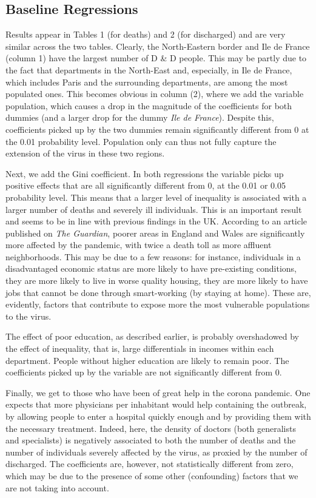 \documentclass[a4paper]{article}
\theoremstyle{plain}
\theoremstyle{definition}
\begin{document}
\subsection{Baseline Regressions}
Results appear in Tables 1 (for deaths) and 2 (for discharged) and are very similar across the two tables. Clearly, the North-Eastern border and Ile de France (column 1) have the largest number of D \& D people. This may be partly due to the fact that departments in the North-East and, especially, in Ile de France, which includes Paris and the surrounding departments, are among the most populated ones. This becomes obvious in column (2), where we add the variable population, which causes a drop in the magnitude of the coefficients for both dummies (and a larger drop for the dummy \textit{Ile de France}). Despite this, coefficients picked up by the two dummies remain significantly different from 0 at the 0.01 probability level. Population only can thus not fully capture the extension of the virus in these two regions.

Next, we add the Gini coefficient. In both regressions the variable picks up positive effects that are all significantly different from 0, at the 0.01 or 0.05 probability level. This means that a larger level of inequality is associated with a larger number of deaths and severely ill individuals. This is an important result and seems to be in line with previous findings in the UK. According to an article published on \textit{The Guardian}, poorer areas in England and Wales are significantly more affected by the pandemic, with twice a death toll as more affluent neighborhoods. This may be due to a few reasons: for instance, individuals in a disadvantaged economic status are more likely to have pre-existing conditions, they are more likely to live in worse quality housing, they are more likely to have jobs that cannot be done through smart-working (by staying at home). These are, evidently, factors that contribute to expose more the most vulnerable populations to the virus.    

The effect of poor education, as described earlier, is probably overshadowed by the effect of inequality, that is, large differentials in incomes within each department. People without higher education are likely to remain poor. The coefficients picked up by the variable are  not significantly different from 0.

Finally, we get to those who have been of great help in the corona pandemic. One expects that more physicians per inhabitant would help containing the outbreak, by allowing people to enter a hospital quickly enough and by providing them with the necessary treatment. Indeed, here, the density of doctors (both generalists and specialists) is negatively associated to both the number of deaths and the number of individuals severely affected by the virus, as proxied by the number of discharged. The coefficients are, however, not statistically different from zero, which may be due to the presence of some other (confounding) factors that we are not taking into account. 
\end{document}
